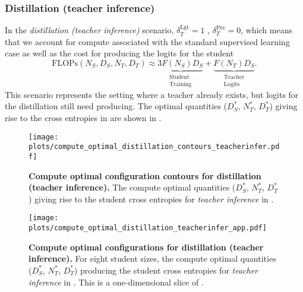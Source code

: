 \FloatBarrier
\subsubsection{Distillation (teacher inference)}
\label{sssec:distillation-teacher-inference}

In the \emph{distillation (teacher inference)} scenario, 
$\delta_T^{\mathrm{Lgt}}=1$ , $\delta_T^{\mathrm{Pre}}=0$,
which means that we  account for compute associated with the standard supervised learning case
as well as the cost for producing the logits for the student
\begin{equation}
    \mathrm{FLOPs}(N_S,D_S,N_T,D_T)\approx
    \underbrace{3F(N_S)D_S}_{\substack{\mathrm{Student}\\\mathrm{Training}}}
    +\underbrace{F(N_T)
    D_S}_{\substack{\mathrm{Teacher}\\\mathrm{Logits}}}.
\end{equation}
This scenario represents the setting where a teacher already exists, but logits for the distillation still need producing.
The optimal quantities ($D_S^*$, $N_T^*$, $D_T^*$) giving rise to the cross entropies in 
are shown in .

\begin{figure}[h]
	\centering
	\texttt{[image: plots/compute\_optimal\_distillation\_contours\_teacherinfer.pdf]}
        \vspace{-0.25cm}
	\caption{\textbf{Compute optimal configuration contours for distillation (teacher inference).} The compute optimal quantities ($D_S^*$, $N_T^*$, $D_T^*$) giving rise to the student cross entropies for \emph{teacher inference} in .
	}
        \vspace{-0.25cm}
	\label{fig:compute-optimal-contours-teacherinfer-app}
\end{figure}

\begin{figure}[h]
	\centering
	\texttt{[image: plots/compute\_optimal\_distillation\_teacherinfer\_app.pdf]}
        \vspace{-0.25cm}
	\caption{\textbf{Compute optimal configurations for distillation (teacher inference).} For eight student sizes, the compute optimal quantities ($D_S^*$, $N_T^*$, $D_T^*$) producing the student cross entropies for \emph{teacher inference} in . This is a one-dimensional slice of .
	}
        \vspace{-0.25cm}
	\label{fig:compute-optimal-distillation-teacherinfer-app}
\end{figure}

